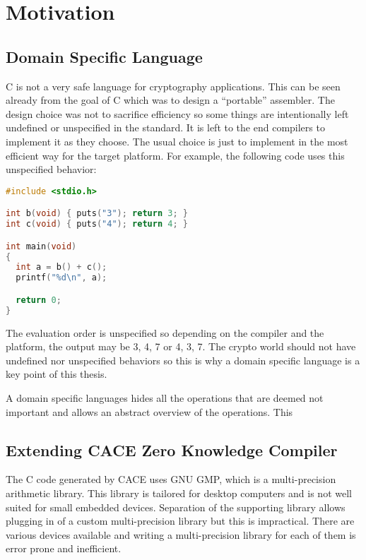 \section{Motivation}

\subsection{Domain Specific Language}

C is not a very safe language for cryptography applications. This
can be seen already from the goal of C which was to design a
``portable'' assembler. The design choice was not to sacrifice
efficiency so some things are intentionally left undefined or
unspecified in the standard. It is left to the end compilers to
implement it as they choose. The usual choice is just to implement in
the most efficient way for the target platform. For example, the
following code uses this unspecified behavior:

\begin{lstlisting}[language=C]
#include <stdio.h>

int b(void) { puts("3"); return 3; }
int c(void) { puts("4"); return 4; }

int main(void)
{
  int a = b() + c();
  printf("%d\n", a);

  return 0;
}
\end{lstlisting}

The evaluation order is unspecified so depending on the compiler and
the platform, the output may be 3, 4, 7 or 4, 3, 7. The crypto world
should not have undefined nor unspecified behaviors so this is why a
domain specific language is a key point of this thesis.

A domain specific languages hides all the operations that are deemed
not important and allows an abstract overview of the operations. This

\subsection{Extending CACE Zero Knowledge Compiler}

The C code generated by CACE uses GNU GMP, which is a multi-precision
arithmetic library. This library is tailored for desktop computers and
is not well suited for small embedded devices. Separation of the
supporting library allows plugging in of a custom multi-precision
library but this is impractical. There are various devices available
and writing a multi-precision library for each of them is error prone
and inefficient. 


